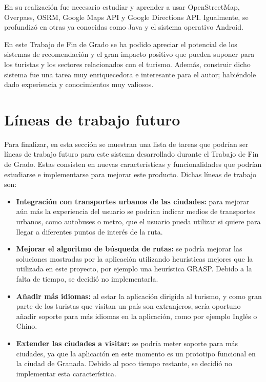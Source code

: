 En su realización fue necesario estudiar y aprender a usar OpenStreetMap, Overpass, OSRM, Google Maps API y Google Directions API. Igualmente, se profundizó en otras ya conocidas como Java y el sistema operativo Android.\newline

En este Trabajo de Fin de Grado se ha podido apreciar el potencial de los sistemas de recomendación y el gran impacto positivo que pueden suponer para los turistas y los sectores relacionados con el turismo. Además, construir dicho sistema fue una tarea muy enriquecedora e interesante para el autor; habiéndole dado experiencia y conocimientos muy valiosos.

\section[Trabajos futuros]{Líneas de trabajo futuro}
Para finalizar, en esta sección se muestran una lista de tareas que podrían ser líneas de trabajo futuro para este sistema desarrollado durante el Trabajo de Fin de Grado. Estas consisten en nuevas características y funcionalidades que podrían estudiarse e implementarse para mejorar este producto. Dichas líneas de trabajo son:
\begin{itemize}
	\item \textbf{Integración con transportes urbanos de las ciudades:} para mejorar aún más la experiencia del usuario se podrían indicar medios de transportes urbanos, como autobuses o metro, que el usuario pueda utilizar si quiere para llegar a diferentes puntos de interés de la ruta.
	\item \textbf{Mejorar el algoritmo de búsqueda de rutas:} se podría mejorar las soluciones mostradas por la aplicación utilizando heurísticas mejores que la utilizada en este proyecto, por ejemplo una heurística GRASP. Debido a la falta de tiempo, se decidió no implementarla.
	\item \textbf{Añadir más idiomas:} al estar la aplicación dirigida al turismo, y como gran parte de los turistas que visitan un país son extranjeros, sería oportuno añadir soporte para más idiomas en la aplicación, como por ejemplo Inglés o Chino.
	\item \textbf{Extender las ciudades a visitar:} se podría meter soporte para más ciudades, ya que la aplicación en este momento es un prototipo funcional en la ciudad de Granada. Debido al poco tiempo restante, se decidió no implementar esta característica.
\end{itemize}